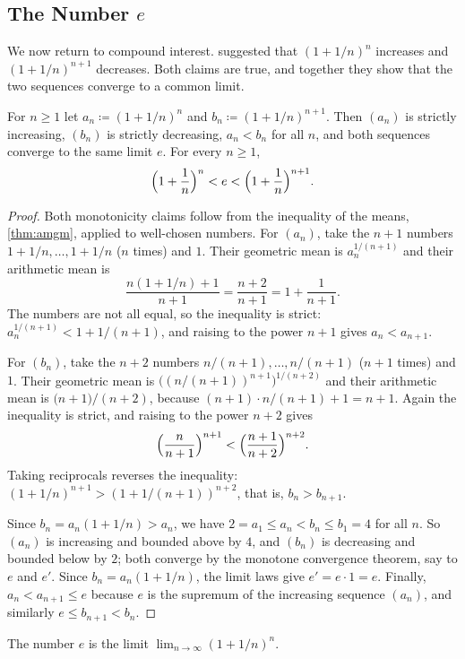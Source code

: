 \subsection{The Number \texorpdfstring{$e$}{e}}

We now return to compound interest.  suggested that $(1+1/n)^n$ increases and $(1+1/n)^{n+1}$ decreases. Both claims are true, and together they show that the two sequences converge to a common limit.

\begin{theorem}
\label{thm:e}
For $n\ge1$ let $a_n\coloneqq(1+1/n)^n$ and $b_n\coloneqq(1+1/n)^{n+1}$. Then $(a_n)$ is strictly increasing, $(b_n)$ is strictly decreasing, $a_n<b_n$ for all $n$, and both sequences converge to the same limit $e$. For every $n\ge1$,
\[
\Bigl(1+\frac1n\Bigr)^n<e<\Bigl(1+\frac1n\Bigr)^{n+1} .
\]
\end{theorem}

\begin{proof}
Both monotonicity claims follow from the inequality of the means, \cref{thm:amgm}, applied to well-chosen numbers. For $(a_n)$, take the $n+1$ numbers $1+1/n,\ldots,1+1/n$ ($n$ times) and $1$. Their geometric mean is $a_n^{1/(n+1)}$ and their arithmetic mean is
\[
\frac{n(1+1/n)+1}{n+1}=\frac{n+2}{n+1}=1+\frac1{n+1} .
\]
The numbers are not all equal, so the inequality is strict: $a_n^{1/(n+1)}<1+1/(n+1)$, and raising to the power $n+1$ gives $a_n<a_{n+1}$.

For $(b_n)$, take the $n+2$ numbers $n/(n+1),\ldots,n/(n+1)$ ($n+1$ times) and $1$. Their geometric mean is $\bigl((n/(n+1))^{n+1}\bigr)^{1/(n+2)}$ and their arithmetic mean is $\bigl(n+1\bigr)/(n+2)$, because $(n+1)\cdot n/(n+1)+1=n+1$. Again the inequality is strict, and raising to the power $n+2$ gives
\[
\Bigl(\frac n{n+1}\Bigr)^{n+1}<\Bigl(\frac{n+1}{n+2}\Bigr)^{n+2} .
\]
Taking reciprocals reverses the inequality: $(1+1/n)^{n+1}>(1+1/(n+1))^{n+2}$, that is, $b_n>b_{n+1}$.

Since $b_n=a_n(1+1/n)>a_n$, we have $2=a_1\le a_n<b_n\le b_1=4$ for all $n$. So $(a_n)$ is increasing and bounded above by $4$, and $(b_n)$ is decreasing and bounded below by $2$; both converge by the monotone convergence theorem, say to $e$ and $e'$. Since $b_n=a_n(1+1/n)$, the limit laws give $e'=e\cdot1=e$. Finally, $a_n<a_{n+1}\le e$ because $e$ is the supremum of the increasing sequence $(a_n)$, and similarly $e\le b_{n+1}<b_n$.
\end{proof}

\begin{definition}
\label{def:e}
The number $e$ is the limit $\lim_{n\to\infty}(1+1/n)^n$.
\end{definition}

